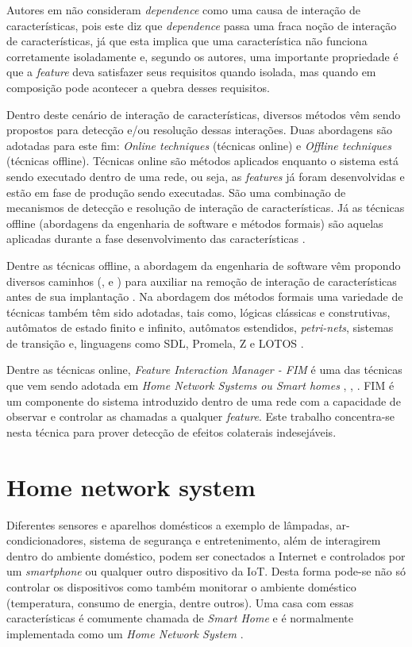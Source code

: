 Autores em \cite{NHLABATSI:2008} não consideram \textit{dependence} como uma causa de interação de características, pois este diz que \textit{dependence} passa uma fraca noção de interação de características, já que esta implica que uma característica não funciona corretamente isoladamente e, segundo os autores, uma importante propriedade é que a \textit{feature} deva satisfazer seus requisitos quando isolada, mas quando em composição pode acontecer a quebra desses requisitos.

Dentro deste cenário de interação de características, diversos métodos vêm sendo propostos para detecção e/ou resolução dessas interações. Duas abordagens são adotadas para este fim: \textit{Online techniques} (técnicas online) e \textit{Offline techniques} (técnicas offline). Técnicas online são métodos aplicados enquanto o sistema está sendo executado dentro de uma rede, ou seja, as \textit{features} já foram desenvolvidas e estão em fase de produção sendo executadas. São uma combinação de mecanismos de detecção e resolução de interação de características. Já as técnicas offline (abordagens da engenharia de software e métodos formais) são aquelas aplicadas durante a fase desenvolvimento das características \cite{Calder:2003}.

Dentre as técnicas offline, a abordagem da engenharia de software vêm propondo diversos caminhos (\cite{Thum:2014}, \cite{Siegmund:2012} e \cite{Siegmund2012}) para auxiliar na remoção de interação de características antes de sua implantação \cite{Calder:2003}. Na abordagem dos métodos formais \cite{Almeida:2011} uma variedade de técnicas também têm sido adotadas, tais como, lógicas clássicas e construtivas, autômatos de estado finito e infinito, autômatos estendidos, \textit{petri-nets}, sistemas de transição e, linguagens como SDL, Promela, Z e LOTOS \cite{Calder:2003}.

Dentre as técnicas online, \textit{Feature Interaction Manager - FIM} é uma das técnicas que vem sendo adotada em \textit{Home Network Systems ou Smart homes} \cite{Wilson:2005}, \cite{Wilson:2008}, \cite{Nakamura:2009}. FIM \cite{Calder:2003} é um componente do sistema introduzido dentro de uma rede com a capacidade de observar e controlar as chamadas a qualquer \textit{feature}. Este trabalho concentra-se nesta técnica para prover detecção de efeitos colaterais indesejáveis.

\section{Home network system}
\label{sec:hns}
Diferentes sensores e aparelhos domésticos a exemplo de lâmpadas, ar-condicionadores, sistema de segurança e entretenimento, além de interagirem dentro do ambiente doméstico, podem ser conectados a Internet e controlados por um \textit{smartphone} ou qualquer outro dispositivo da IoT. Desta forma pode-se não só controlar os dispositivos como também monitorar o ambiente doméstico (temperatura, consumo de energia, dentre outros). Uma casa com essas características é comumente chamada de \textit{Smart Home} e é normalmente implementada como um \textit{Home Network System} \cite{Piyare:2013}.

